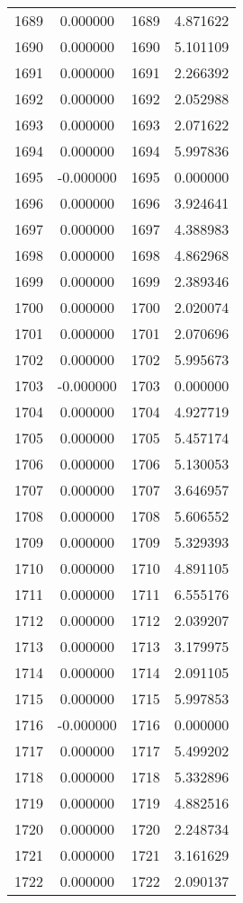 \documentclass[12pt]{article}
\begin{document}
\begin{longtable}{@{}cccc@{}}
1689 & 0.000000 & 1689 & 4.871622 \\
1690 & 0.000000 & 1690 & 5.101109 \\
1691 & 0.000000 & 1691 & 2.266392 \\
1692 & 0.000000 & 1692 & 2.052988 \\
1693 & 0.000000 & 1693 & 2.071622 \\
1694 & 0.000000 & 1694 & 5.997836 \\
1695 & -0.000000 & 1695 & 0.000000 \\
1696 & 0.000000 & 1696 & 3.924641 \\
1697 & 0.000000 & 1697 & 4.388983 \\
1698 & 0.000000 & 1698 & 4.862968 \\
1699 & 0.000000 & 1699 & 2.389346 \\
1700 & 0.000000 & 1700 & 2.020074 \\
1701 & 0.000000 & 1701 & 2.070696 \\
1702 & 0.000000 & 1702 & 5.995673 \\
1703 & -0.000000 & 1703 & 0.000000 \\
1704 & 0.000000 & 1704 & 4.927719 \\
1705 & 0.000000 & 1705 & 5.457174 \\
1706 & 0.000000 & 1706 & 5.130053 \\
1707 & 0.000000 & 1707 & 3.646957 \\
1708 & 0.000000 & 1708 & 5.606552 \\
1709 & 0.000000 & 1709 & 5.329393 \\
1710 & 0.000000 & 1710 & 4.891105 \\
1711 & 0.000000 & 1711 & 6.555176 \\
1712 & 0.000000 & 1712 & 2.039207 \\
1713 & 0.000000 & 1713 & 3.179975 \\
1714 & 0.000000 & 1714 & 2.091105 \\
1715 & 0.000000 & 1715 & 5.997853 \\
1716 & -0.000000 & 1716 & 0.000000 \\
1717 & 0.000000 & 1717 & 5.499202 \\
1718 & 0.000000 & 1718 & 5.332896 \\
1719 & 0.000000 & 1719 & 4.882516 \\
1720 & 0.000000 & 1720 & 2.248734 \\
1721 & 0.000000 & 1721 & 3.161629 \\
1722 & 0.000000 & 1722 & 2.090137 \\

\end{longtable}
\end{document}

